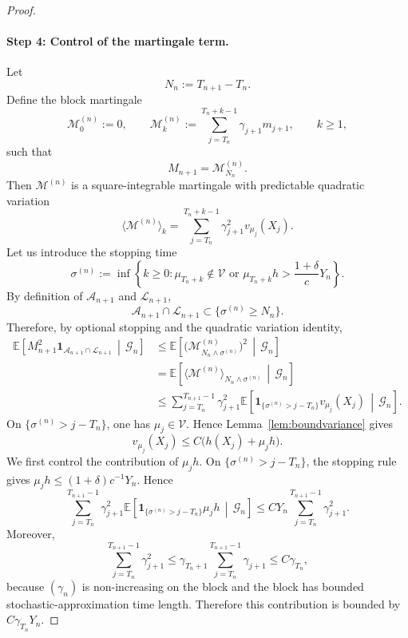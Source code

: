 \documentclass[10pt,letterpaper]{article}
\theoremstyle{compactplain}
\theoremstyle{compactdefinition}
\newcommand{\1}{\mathds{1}}
\begin{document}
\begin{proof}
\paragraph{Step 4: Control of the martingale term.}
Let
\[
N_n:=T_{n+1}-T_n.
\]
Define the block martingale
\[
\mathcal M_0^{(n)}:=0,
\qquad
\mathcal M_k^{(n)}
:=
\sum_{j=T_n}^{T_n+k-1}\gamma_{j+1}m_{j+1},
\qquad k\geq1,
\]
such that
\[
M_{n+1}=\mathcal M_{N_n}^{(n)}.
\]
Then \(\mathcal M^{(n)}\) is a square-integrable martingale with predictable
quadratic variation
\[
\langle\mathcal M^{(n)}\rangle_k
=
\sum_{j=T_n}^{T_n+k-1}
\gamma_{j+1}^2v_{\mu_j}(X_j).
\]
Let us introduce the stopping time
\[
\sigma^{(n)}
:=
\inf\left\{
k\geq0:
\mu_{T_n+k}\notin\mathcal V
\text{ or }
\mu_{T_n+k}h>
\frac{1+\delta}{c}Y_n
\right\}.
\]
By definition of \(\mathcal A_{n+1}\) and \(\mathcal L_{n+1}\),
\[
\mathcal A_{n+1}\cap\mathcal L_{n+1}
\subset
\{\sigma^{(n)}\geq N_n\}.
\]
Therefore, by optional stopping and the quadratic variation identity,
\[
\begin{aligned}
\mathbb E\left[
M_{n+1}^2
\mathbf 1_{\mathcal A_{n+1}\cap\mathcal L_{n+1}}
\,\middle|\,
\mathcal G_n
\right]
&\leq
\mathbb E\left[
\bigl(\mathcal M_{N_n\wedge\sigma^{(n)}}^{(n)}\bigr)^2
\,\middle|\,
\mathcal G_n
\right] \\
&=
\mathbb E\left[
\langle\mathcal M^{(n)}\rangle_{N_n\wedge\sigma^{(n)}}
\,\middle|\,
\mathcal G_n
\right] \\
&\leq
\sum_{j=T_n}^{T_{n+1}-1}
\gamma_{j+1}^2
\mathbb E\left[
\mathbf 1_{\{\sigma^{(n)}>j-T_n\}}
v_{\mu_j}(X_j)
\,\middle|\,
\mathcal G_n
\right].
\end{aligned}
\]
On \(\{\sigma^{(n)}>j-T_n\}\), one has \(\mu_j\in\mathcal V\). Hence
Lemma~\ref{lem:boundvariance} gives
\[
v_{\mu_j}(X_j)
\leq
C\bigl(h(X_j)+\mu_jh\bigr).
\]
We first control the contribution of \(\mu_jh\). On
\(\{\sigma^{(n)}>j-T_n\}\), the stopping rule gives
\(\mu_jh\leq (1+\delta)c^{-1}Y_n\). Hence
\[
\sum_{j=T_n}^{T_{n+1}-1}
\gamma_{j+1}^2
\mathbb E\left[
\mathbf 1_{\{\sigma^{(n)}>j-T_n\}}\mu_jh
\,\middle|\,
\mathcal G_n
\right]
\leq
C Y_n
\sum_{j=T_n}^{T_{n+1}-1}\gamma_{j+1}^2.
\]
Moreover,
\[
\sum_{j=T_n}^{T_{n+1}-1}\gamma_{j+1}^2
\leq
\gamma_{T_n+1}
\sum_{j=T_n}^{T_{n+1}-1}\gamma_{j+1}
\leq
C\gamma_{T_n},
\]
because \((\gamma_n)\) is non-increasing on the block and the block has bounded
stochastic-approximation time length. Therefore this contribution is bounded by
\(C\gamma_{T_n}Y_n\).


\end{proof}
\end{document}
